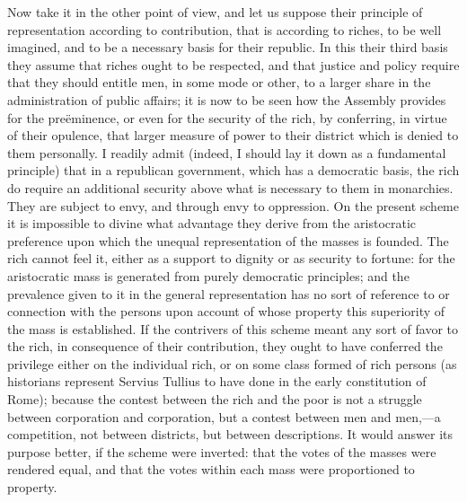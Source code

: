 Now take it in the other point of view, and let us suppose their principle of representation according to contribution, that is according to riches, to be well imagined, and to be a necessary basis for their republic. In this their third basis they assume that riches ought to be respected, and that justice and policy require that they should entitle men, in some mode or other, to a larger share in the administration of public affairs; it is now to be seen how the Assembly provides for the preëminence, or even for the security of the rich, by conferring, in virtue of their opulence, that larger measure of power to their district which is denied to them personally. I readily admit (indeed, I should lay it down as a fundamental principle) that in a republican government, which has a democratic basis, the rich do require an additional security above what is necessary to them in monarchies. They are subject to envy, and through envy to oppression. On the present scheme it is impossible to divine what advantage they derive from the aristocratic preference upon which the unequal representation of the masses is founded. The rich cannot feel it, either as a support to dignity or as security to fortune: for the aristocratic mass is generated from purely democratic principles; and the prevalence given to it in the general representation has no sort of reference to or connection with the persons upon account of whose property this superiority of the mass is established. If the contrivers of this scheme meant any sort of favor to the rich, in consequence of their contribution, they ought to have conferred the privilege either on the individual rich, or on some class formed of rich persons (as historians represent Servius Tullius to have done in the early constitution of Rome); because the contest between the rich and the poor is not a struggle between corporation and corporation, but a contest between men and men,—a competition, not between districts, but between descriptions. It would answer its purpose better, if the scheme were inverted: that the votes of the masses were rendered equal, and that the votes within each mass were proportioned to property.

